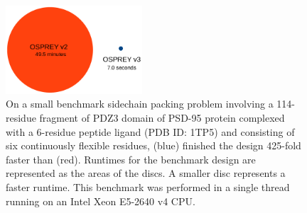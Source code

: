 \begin{figure}\label{fig:speedup}
\center
\includegraphics[width=2in]{figures/speedup.pdf}
\caption{On a small benchmark sidechain packing problem involving a 114-residue fragment of PDZ3 domain of PSD-95 protein complexed with a 6-residue peptide ligand (PDB ID: 1TP5) and consisting of six continuously flexible residues,  (blue) finished the design 425-fold faster than  (red). Runtimes for the benchmark design are represented as the areas of the discs. A smaller disc represents a faster runtime. This benchmark was performed in a single thread running on an Intel Xeon E5-2640 v4 CPU.}
\end{figure}
